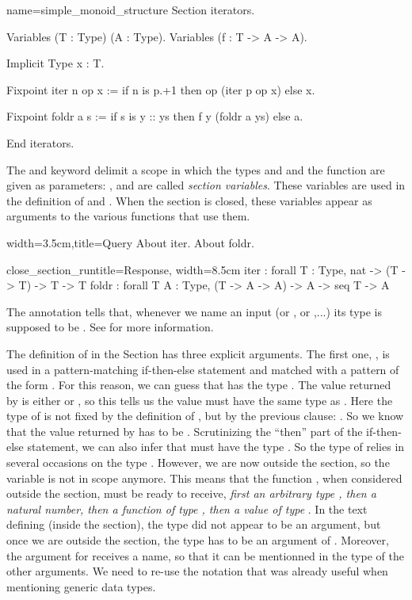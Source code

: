 \begin{coq}{name=simple_monoid_structure}{}
Section iterators.

Variables (T : Type) (A : Type).
Variables (f : T -> A -> A).

Implicit Type x : T.

Fixpoint iter n op x :=
  if n is p.+1 then op (iter p op x) else x.

Fixpoint foldr a s :=
  if s is y :: ys then f y (foldr a ys) else a.

End iterators.
\end{coq}
The  and  keyword delimit a scope in which
the types  and  and the function  are given as
parameters: ,  and  are called \emph{section
  variables}.  These variables
are used in the definition of  and .  When
the section is closed, these variables appear as arguments to
the various functions that use them.

\begin{coq}{}{width=3.5cm,title=Query}
About iter.
About foldr.
$~$
\end{coq}
\begin{coqout}{close_section_run}{title=Response, width=8.5cm}
iter : forall T : Type, nat -> (T -> T) -> T -> T
foldr :
  forall T A : Type, (T -> A -> A) -> A -> seq T -> A
\end{coqout}
The  annotation tells \Coq{} that, whenever we name
an input  (or , or ,...) its type is supposed to be
. See \cite{Coq:manual} for more information.

The definition of  in the Section has three explicit
arguments. The first one, , is used in
a pattern-matching if-then-else statement and matched with a pattern of the
form .  For this reason, we can guess that  has the type .
The value returned by  is either  or , so this
tells us the value must have the same type as .  Here the type of
 is not fixed by the definition of , but by the previous clause:
.  So we know that the value returned by 
has to be .  Scrutinizing the ``then'' part of the if-then-else statement,
we can also infer that  must have the type .  So the type
of  relies in several occasions on the type .  However, we are
now outside the section, so the variable  is not in
scope anymore.  This means that the function , when considered
outside the section, must be ready to receive, {\em first an arbitrary type
 , then a natural number, then a function of type , then a
value of type }.  In the text defining  (inside the section), the
type  did not appear to be an argument, but once we are outside
the section, the type  has to be an argument of .  Moreover,
the argument for  receives a name, so that it can be mentionned
in the type of the other arguments.  We need to re-use the 
notation that was already useful when mentioning generic data types.

